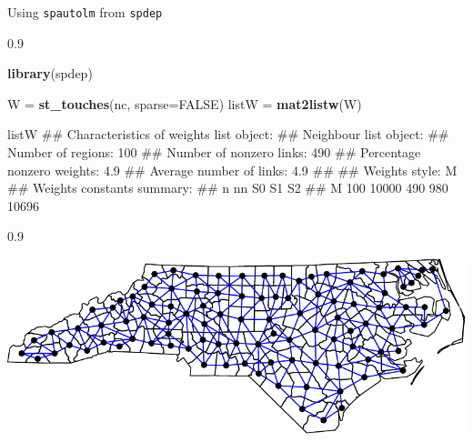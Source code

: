 \documentclass[11pt,ignorenonframetext,]{beamer}
\newenvironment{Shaded}{}{}
\newcommand{\DataTypeTok}[1]{\textcolor[rgb]{0.56,0.13,0.00}{#1}}
\newcommand{\DecValTok}[1]{\textcolor[rgb]{0.25,0.63,0.44}{#1}}
\newcommand{\KeywordTok}[1]{\textcolor[rgb]{0.00,0.44,0.13}{\textbf{#1}}}
\newcommand{\NormalTok}[1]{#1}
\newcommand{\OperatorTok}[1]{\textcolor[rgb]{0.40,0.40,0.40}{#1}}
\newcommand{\OtherTok}[1]{\textcolor[rgb]{0.00,0.44,0.13}{#1}}
\newcommand{\StringTok}[1]{\textcolor[rgb]{0.25,0.44,0.63}{#1}}
\let\oldShaded\Shaded
\let\endoldShaded\endShaded
\renewenvironment{Shaded}{\footnotesize\begin{spacing}{0.9}\oldShaded}{\endoldShaded\end{spacing}}
\begin{document}
\begin{frame}[fragile,t]{Using \texttt{spautolm} from \texttt{spdep}}
\protect\hypertarget{using-spautolm-from-spdep}{}

\begin{Shaded}
\begin{Highlighting}[]
\KeywordTok{library}\NormalTok{(spdep)}

\NormalTok{W =}\StringTok{ }\KeywordTok{st_touches}\NormalTok{(nc, }\DataTypeTok{sparse=}\OtherTok{FALSE}\NormalTok{)}
\NormalTok{listW =}\StringTok{ }\KeywordTok{mat2listw}\NormalTok{(W)}

\NormalTok{listW}
\NormalTok{## Characteristics of weights list object:}
\NormalTok{## Neighbour list object:}
\NormalTok{## Number of regions: 100 }
\NormalTok{## Number of nonzero links: 490 }
\NormalTok{## Percentage nonzero weights: 4.9 }
\NormalTok{## Average number of links: 4.9 }
\NormalTok{## }
\NormalTok{## Weights style: M }
\NormalTok{## Weights constants summary:}
\NormalTok{##     n    nn  S0  S1    S2}
\NormalTok{## M 100 10000 490 980 10696}
\end{Highlighting}
\end{Shaded}

\end{frame}

\begin{frame}[fragile,t]{}
\protect\hypertarget{section-3}{}

\begin{Shaded}
\end{Shaded}

\begin{center}\includegraphics[width=\textwidth]{Lec18_files/figure-beamer/unnamed-chunk-9-1} \end{center}

\end{frame}
\end{document}
